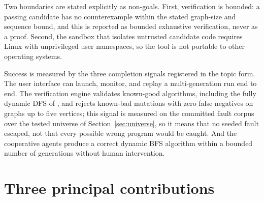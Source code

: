 Two boundaries are stated explicitly as non-goals. First, verification is
bounded: a passing candidate has no counterexample within the stated graph-size
and sequence bound, and this is reported as bounded exhaustive verification,
never as a proof. Second, the sandbox that isolates untrusted candidate code
requires Linux with unprivileged user namespaces, so the tool is not portable to
other operating systems.

Success is measured by the three completion signals registered in the topic
form. The user interface can launch, monitor, and replay a multi-generation run
end to end. The verification engine validates known-good algorithms, including
the fully dynamic DFS of \citet{yang2019dynamic}, and rejects known-bad
mutations with zero false negatives on graphs up to five vertices; this
signal is measured on the committed fault corpus over the tested universe of
Section~\ref{sec:universe}, so it means that no seeded fault escaped, not that
every possible wrong program would be caught. And the
cooperative agents produce a correct dynamic BFS algorithm within a bounded
number of generations without human intervention.

\section{Three principal contributions}
\label{sec:contributions}


